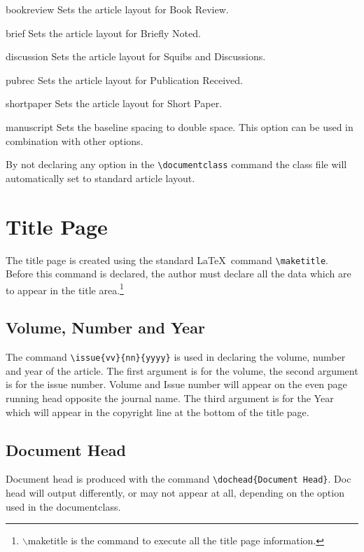 \documentclass[manuscript]{clv3}
\begin{document}
\begin{deflist}
\item[bookreview] Sets the article layout for Book Review.
\item[brief] Sets the article layout for Briefly Noted.
\item[discussion] Sets the article layout for Squibs and Discussions.
\item[pubrec] Sets the article layout for Publication Received.
\item[shortpaper] Sets the article layout for Short Paper.
\item[manuscript] Sets the baseline spacing to double space. This 
option can be used in combination with other options.
\end{deflist}

By not declaring any option in the \verb|\documentclass| command the class file
will automatically set to standard article layout.

\section{Title Page}

The title page is created using the standard \LaTeX\ command \verb|\maketitle|. 
Before this command is declared, the author must declare all the data which are 
to appear in the title area.\footnote{$\backslash$maketitle is the command to execute all the title page information.}

\subsection{Volume, Number and Year}

The command \verb|\issue{vv}{nn}{yyyy}| is used in declaring the volume, number
and year of the article. The first argument is for the volume, the second argument 
is for the issue number. Volume and Issue number will appear on the even page 
running head opposite the journal name. The third argument is for the Year which 
will appear in the copyright line at the bottom of the title page.

\subsection{Document Head}

Document head is produced with the command \verb|\dochead{Document Head}|. Doc head 
will output differently, or may not appear at all, depending on the option used in the 
documentclass.
\end{document}
